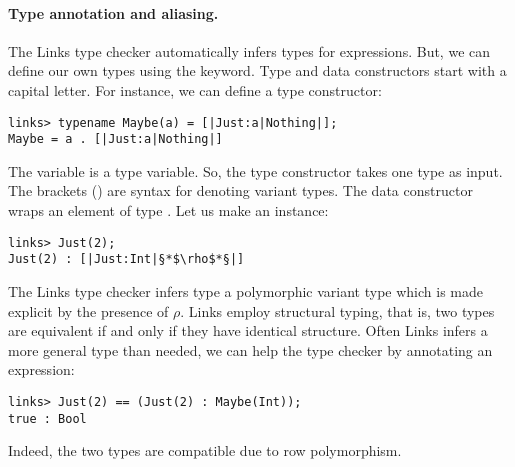 \paragraph{Type annotation and aliasing.} The Links type checker automatically infers types for expressions. But, we can define our own types using the  keyword. Type and data constructors start with a capital letter. For instance, we can define a  type constructor:
\begin{lstlisting}[style=links]
links> typename Maybe(a) = [|Just:a|Nothing|];
Maybe = a . [|Just:a|Nothing|]
\end{lstlisting}
The variable  is a type variable. So, the type constructor  takes one type  as input. The brackets (\code{[|...|]}) are syntax for denoting variant types. The data constructor  wraps an element of type . Let us make an instance:
\begin{lstlisting}[style=links]
links> Just(2);
Just(2) : [|Just:Int|§*$\rho$*§|]
\end{lstlisting}
The Links type checker infers type a polymorphic variant type which is made explicit by the presence of $\rho$. Links employ structural typing, that is, two types are equivalent if and only if they have identical structure. Often Links infers a more general type than needed, we can help the type checker by annotating an expression:
\begin{lstlisting}[style=links]
links> Just(2) == (Just(2) : Maybe(Int));
true : Bool
\end{lstlisting}
Indeed, the two types are compatible due to row polymorphism.

